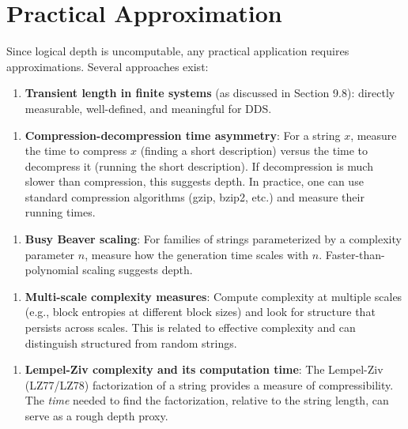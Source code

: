 \section{Practical Approximation}

Since logical depth is uncomputable, any practical application requires approximations. Several approaches exist:

\begin{enumerate}
\item \textbf{Transient length in finite systems} (as discussed in Section 9.8): directly measurable, well-defined, and meaningful for DDS.
\end{enumerate}

\begin{enumerate}
\item \textbf{Compression-decompression time asymmetry}: For a string $x$, measure the time to compress $x$ (finding a short description) versus the time to decompress it (running the short description). If decompression is much slower than compression, this suggests depth. In practice, one can use standard compression algorithms (gzip, bzip2, etc.) and measure their running times.
\end{enumerate}

\begin{enumerate}
\item \textbf{Busy Beaver scaling}: For families of strings parameterized by a complexity parameter $n$, measure how the generation time scales with $n$. Faster-than-polynomial scaling suggests depth.
\end{enumerate}

\begin{enumerate}
\item \textbf{Multi-scale complexity measures}: Compute complexity at multiple scales (e.g., block entropies at different block sizes) and look for structure that persists across scales. This is related to effective complexity and can distinguish structured from random strings.
\end{enumerate}

\begin{enumerate}
\item \textbf{Lempel-Ziv complexity and its computation time}: The Lempel-Ziv (LZ77/LZ78) factorization of a string provides a measure of compressibility. The \textit{time} needed to find the factorization, relative to the string length, can serve as a rough depth proxy.
\end{enumerate}

